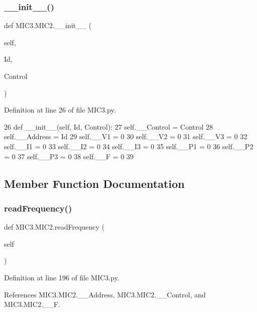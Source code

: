 \subsubsection{\texorpdfstring{\+\_\+\+\_\+init\+\_\+\+\_\+()}{\_\_init\_\_()}}
{\footnotesize\ttfamily def M\+I\+C3.\+M\+I\+C2.\+\_\+\+\_\+init\+\_\+\+\_\+ (\begin{DoxyParamCaption}\item[{}]{self,  }\item[{}]{Id,  }\item[{}]{Control }\end{DoxyParamCaption})}



Definition at line 26 of file M\+I\+C3.\+py.


\begin{DoxyCode}
26     \textcolor{keyword}{def }\_\_init\_\_(self, Id, Control):
27         self.\_\_Control = Control
28         self.\_\_Address = Id
29         self.\_\_V1 = 0
30         self.\_\_V2 = 0
31         self.\_\_V3 = 0
32         self.\_\_I1 = 0
33         self.\_\_I2 = 0
34         self.\_\_I3 = 0
35         self.\_\_P1 = 0
36         self.\_\_P2 = 0
37         self.\_\_P3 = 0
38         self.\_\_F  = 0
39         
\end{DoxyCode}


\subsection{Member Function Documentation}
\mbox{\label{class_m_i_c3_1_1_m_i_c2_acb035c98c0276bf264a1b33e05bae4dd}} 
\subsubsection{\texorpdfstring{read\+Frequency()}{readFrequency()}}
{\footnotesize\ttfamily def M\+I\+C3.\+M\+I\+C2.\+read\+Frequency (\begin{DoxyParamCaption}\item[{}]{self }\end{DoxyParamCaption})}



Definition at line 196 of file M\+I\+C3.\+py.



References M\+I\+C3.\+M\+I\+C2.\+\_\+\+\_\+\+Address, M\+I\+C3.\+M\+I\+C2.\+\_\+\+\_\+\+Control, and M\+I\+C3.\+M\+I\+C2.\+\_\+\+\_\+F.


